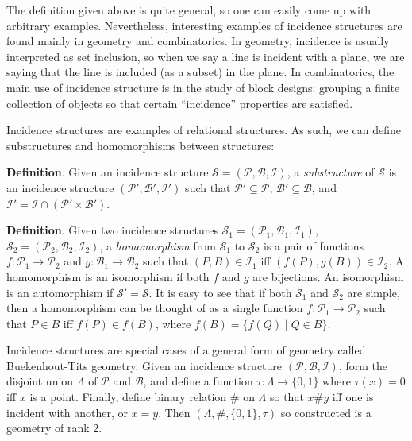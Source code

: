\documentclass[12pt]{article}
\begin{document}
The definition given above is quite general, so one can easily come up with arbitrary examples.  Nevertheless, interesting examples of incidence structures are found mainly in geometry and combinatorics.  In geometry, incidence is usually interpreted as set inclusion, so when we say a line is incident with a plane, we are saying that the line is included (as a subset) in the plane.  In combinatorics, the main use of incidence structure is in the study of block designs: grouping a finite collection of objects so that certain ``incidence'' properties are satisfied.

Incidence structures are examples of relational structures.  As such, we can define substructures and homomorphisms between structures:

\textbf{Definition}.  Given an incidence structure $\mathcal{S}=(\mathcal{P},\mathcal{B},\mathcal{I})$, a \emph{substructure} of $\mathcal{S}$ is an incidence structure $(\mathcal{P}',\mathcal{B}',\mathcal{I}')$ such that $\mathcal{P}'\subseteq \mathcal{P}$, $\mathcal{B}'\subseteq \mathcal{B}$, and $\mathcal{I}'=\mathcal{I}\cap (\mathcal{P}'\times \mathcal{B}')$.

\textbf{Definition}.  Given two incidence structures $\mathcal{S}_1=(\mathcal{P}_1,\mathcal{B}_1,\mathcal{I}_1)$, $\mathcal{S}_2=(\mathcal{P}_2,\mathcal{B}_2,\mathcal{I}_2)$, a \emph{homomorphism} from $\mathcal{S}_1$ to $\mathcal{S}_2$ is a pair of functions $f:\mathcal{P}_1\to \mathcal{P}_2$ and $g:\mathcal{B}_1\to \mathcal{B}_2$ such that $(P,B)\in \mathcal{I}_1$ iff $(f(P),g(B))\in \mathcal{I}_2$.  A homomorphism is an isomorphism if both $f$ and $g$ are bijections.  An isomorphism is an automorphism if $\mathcal{S}'=\mathcal{S}$.  It is easy to see that if both $\mathcal{S}_1$ and $\mathcal{S}_2$ are simple, then a homomorphism can be thought of as a single function $f:\mathcal{P}_1\to \mathcal{P}_2$ such that $P\in B$ iff $f(P)\in f(B)$, where $f(B)=\lbrace f(Q)\mid Q\in B\rbrace$.

Incidence structures are special cases of a general form of geometry called Buekenhout-Tits geometry.  Given an incidence structure $(\mathcal{P},\mathcal{B},\mathcal{I})$, form the disjoint union $\Lambda$ of $\mathcal{P}$ and $\mathcal{B}$, and define a function $\tau: \Lambda \to \lbrace 0,1\rbrace$ where $\tau(x)=0$ iff $x$ is a point.  Finally, define binary relation $\#$ on $\Lambda$ so that $x\# y$ iff one is incident with another, or $x=y$.  Then $(\Lambda,\#,\lbrace 0,1\rbrace,\tau)$ so constructed is a geometry of rank 2.
\end{document}
